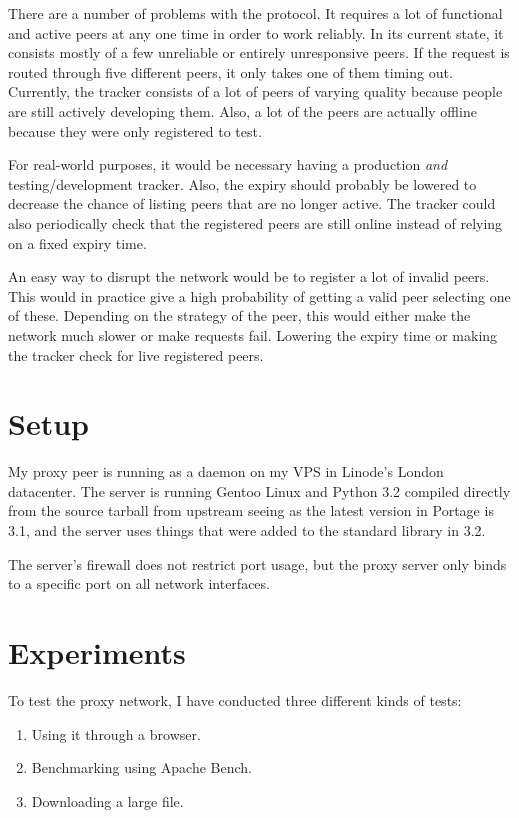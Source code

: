 \documentclass{sig-alternate}
\begin{document}
There are a number of problems with the protocol. It requires a lot of
functional and active peers at any one time in order to work reliably. In its
current state, it consists mostly of a few unreliable or entirely unresponsive
peers. If the request is routed through five different peers, it only takes
one of them timing out. Currently, the tracker consists of a lot of peers of
varying quality because people are still actively developing them. Also, a lot
of the peers are actually offline because they were only registered to test.

For real-world purposes, it would be necessary having a production \emph{and}
testing/development tracker. Also, the expiry should probably be lowered to
decrease the chance of listing peers that are no longer active. The tracker
could also periodically check that the registered peers are still online
instead of relying on a fixed expiry time.

An easy way to disrupt the network would be to register a lot of invalid
peers. This would in practice give a high probability of getting a valid peer
selecting one of these. Depending on the strategy of the peer, this would
either make the network much slower or make requests fail. Lowering the expiry
time or making the tracker check for live registered peers.


\section{Setup}
\label{sec:setup}

My proxy peer is running as a daemon on my VPS in Linode's London datacenter.
The server is running Gentoo Linux and Python 3.2 compiled directly from the
source tarball from upstream seeing as the latest version in Portage is 3.1,
and the server uses things that were added to the standard library in 3.2.

The server's firewall does not restrict port usage, but the proxy server only
binds to a specific port on all network interfaces.


\section{Experiments}
\label{sec:experiments}

To test the proxy network, I have conducted three different kinds of tests:

\begin{enumerate}
    \item Using it through a browser.
    \item Benchmarking using Apache Bench.
    \item Downloading a large file.
\end{enumerate}
\end{document}
